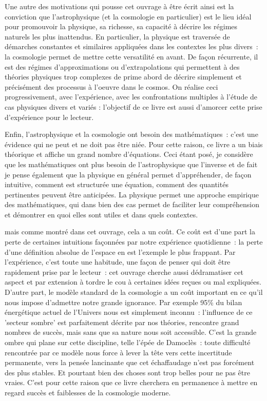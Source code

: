 Une autre des motivations qui pousse cet ouvrage à être écrit ainsi est la conviction que l'astrophysique (et la cosmologie en particulier) est le lieu idéal pour promouvoir la physique, sa richesse, sa capacité à décrire les régimes naturels les plus inattendus. En particulier, la physique est traversée de démarches constantes et similaires appliquées dans les contextes les plus divers~: la cosmologie permet de mettre cette versatilité en avant. De façon récurrente, il est des régimes d'approximations ou d'extrapolations qui permettent à des théories physiques trop complexes de prime abord de décrire simplement et précisément des processus à l'oeuvre dans le cosmos. On réalise ceci progressivement, avec l'expérience, avec les confrontations multiples à l'étude de cas physiques divers et variés : l'objectif de ce livre est aussi d'amorcer cette prise d'expérience pour le lecteur.

Enfin, l'astrophysique et la cosmologie ont besoin des mathématiques~: c'est une évidence qui ne peut et ne doit pas être niée. Pour cette raison, ce livre a un biais théorique et affiche un grand nombre d'équations. Ceci étant posé, je considère que les mathématiques ont plus besoin de l'astrophysique que l'inverse et de fait je pense également que la physique en général permet d'appréhender, de façon intuitive, comment est structurée une équation, comment des quantités pertinentes peuvent être anticipées. La physique permet une approche empirique des mathématiques, qui dans bien des cas permet de faciliter leur compréhension et démontrer en quoi elles sont utiles et dans quels contextes.

 mais comme montré dans cet ouvrage, cela a un coût. Ce coût est d'une part la perte de certaines intuitions façonnées par notre expérience quotidienne~: la perte d'une définition absolue de l'espace en est l'exemple le plus frappant. Par l'expérience, c'est toute une habitude, une façon de penser qui doit être rapidement prise par le lecteur~: cet ouvrage cherche aussi dédramatiser cet aspect et par extension à tordre le cou à certaines idées reçues ou mal expliquées. D'autre part, le modèle standard de la cosmologie a un coût important en ce qu'il nous impose d'admettre notre grande ignorance. Par exemple 95\% du bilan énergétique actuel de l'Univers nous est simplement inconnu~: l'influence de ce 'secteur sombre' est parfaitement décrite par nos théories, rencontre grand nombres de succès, mais sans que sa nature nous soit accessible. C'est la grande ombre qui plane sur cette discipline, telle l'épée de Damoclès~: toute difficulté rencontrée par ce modèle nous force à lever la tête vers cette incertitude permanente, vers la pensée lancinante que cet échaffaudage n'est pas forcément des plus stables. Et pourtant bien des choses sont trop belles pour ne pas être vraies. C'est pour cette raison que ce livre cherchera en permanence à mettre en regard succès et faiblesses de la cosmologie moderne.

